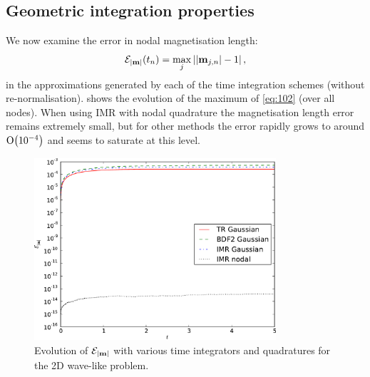 \subsection{Geometric integration properties}
\label{sec:2d-wave-results-cons-prop}

We now examine the error in nodal magnetisation length:
\begin{equation}
  \mathcal{E}_{\left|{\boldsymbol{\mathrm{m}}} \right|}(t_n) = \max_j \left|{\left|{\boldsymbol{\mathrm{m}}_{j,n}} \right| - 1} \right|,
  \label{eq:102}
\end{equation}
in the approximations generated by each of the time integration schemes (without re-normalisation).
 shows the evolution of the maximum of \cref{eq:102} (over all nodes).
When using IMR with nodal quadrature the magnetisation length error remains extremely small, but for other methods the error rapidly grows to around $\mathrm{O}{\left( 10^{-4} \right)}$ and seems to saturate at this level.
\begin{figure}
  \centering
  \includegraphics[width=0.8\textwidth]
  {plots/2d_wave_solution_m_length/mlengtherrormaxesvstimes.pdf}
  \caption{Evolution of $\mathcal{E}_{\left|{\boldsymbol{\mathrm{m}}} \right|}$ with various time integrators and quadratures for the 2D wave-like problem.
  }
  \label{fig:mean-ml-error-2d}
\end{figure}

